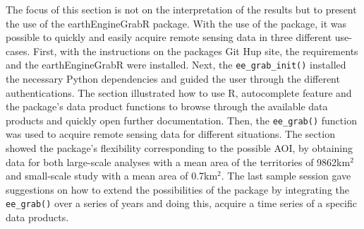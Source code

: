 The focus of this section is not on the interpretation of the results but to present the use of the earthEngineGrabR package.
With the use of the package, it was possible to quickly and easily acquire remote sensing data in three different use-cases. First, with the instructions on the packages Git Hup site, the requirements and the earthEngineGrabR were installed. Next, the \texttt{ee\_grab\_init()} installed the necessary Python dependencies and guided the user through the different authentications. The section illustrated how to use R, autocomplete feature and the package's data product functions to browse through the available data products and quickly open further documentation. Then, the \texttt{ee\_grab()} function was used to acquire remote sensing data for different situations. The section showed the package's flexibility corresponding to the possible AOI, by obtaining data for both large-scale analyses with a mean area of the territories of 9862km$^2$ and small-scale study with a mean area of 0.7km$^2$.
The last sample session gave suggestions on how to extend the possibilities of the package by integrating the \texttt{ee\_grab()} over a series of years and doing this, acquire a time series of a specific data products.







